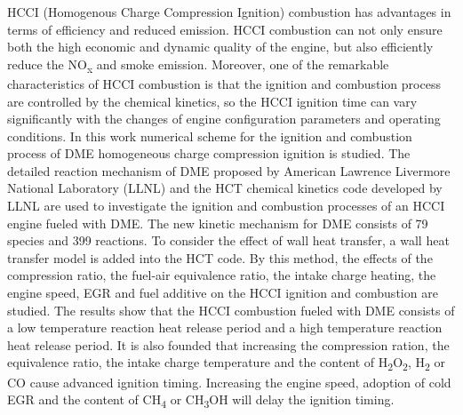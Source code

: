 \begin{abstracten}
HCCI (Homogenous Charge Compression Ignition) combustion has advantages in terms of efficiency and reduced emission. HCCI combustion can not only ensure both the high economic and dynamic quality of the engine, but also efficiently reduce the NO\textsubscript{x} and smoke emission. Moreover, one of the remarkable characteristics of HCCI combustion is that the ignition and combustion process are controlled by the chemical kinetics, so the HCCI ignition time can vary significantly with the changes of engine configuration parameters and operating conditions. In this work numerical scheme for the ignition and combustion process of DME homogeneous charge compression ignition is studied. The detailed reaction mechanism of DME proposed by American Lawrence Livermore National Laboratory (LLNL) and the HCT chemical kinetics code developed by LLNL are used to investigate the ignition and combustion processes of an HCCI engine fueled with DME. The new kinetic mechanism for DME consists of 79 species and 399 reactions. To consider the effect of wall heat transfer, a wall heat transfer model is added into the HCT code. By this method, the effects of the compression ratio, the fuel-air equivalence ratio, the intake charge heating, the engine speed, EGR and fuel additive on the HCCI ignition and combustion are studied. The results show that the HCCI combustion fueled with DME consists of a low temperature reaction heat release period and a high temperature reaction heat release period. It is also founded that increasing the compression ration, the equivalence ratio, the intake charge temperature and the content of H\textsubscript{2}O\textsubscript{2}, H\textsubscript{2} or CO cause advanced ignition timing. Increasing the engine speed, adoption of cold EGR and the content of CH\textsubscript{4} or CH\textsubscript{3}OH will delay the ignition timing.
\end{abstracten}
